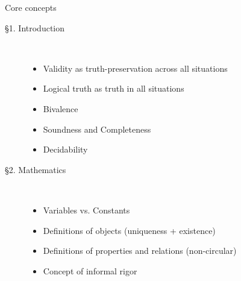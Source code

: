 \begin{frame}{Core concepts}

	\begin{description}
	
		\item[\S1. Introduction] \
		
			\begin{itemize}
			
				\item Validity as truth-preservation across all situations
				
				\item Logical truth as truth in all situations
				
				\item Bivalence 
								
				\item Soundness and Completeness
				
				\item Decidability
			
			\end{itemize}
	
		\item[\S2. Mathematics] \
		
			\begin{itemize}
			
				\item Variables vs. Constants
				
				\item Definitions of objects (uniqueness + existence)
				
				\item Definitions of properties and relations (non-circular)
				
				\item Concept of informal rigor
			
			\end{itemize}
	
	\end{description}

\end{frame}

